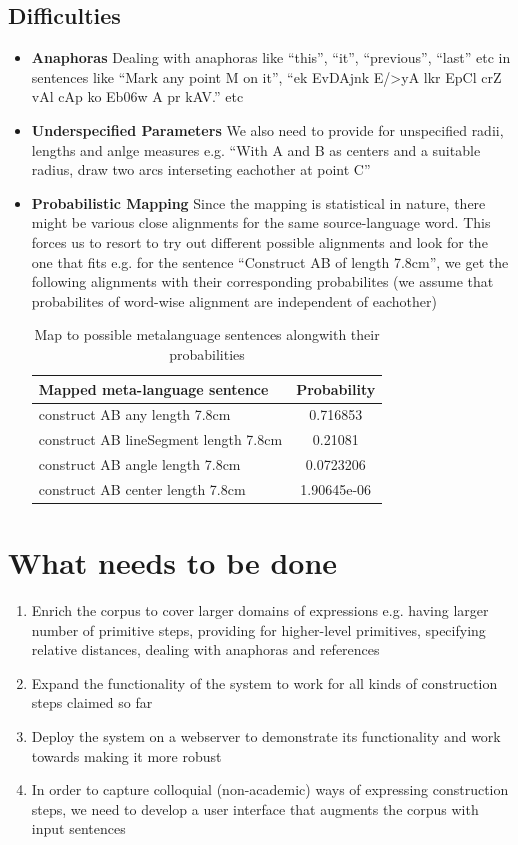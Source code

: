 \def\DevnagVersion{2.15}\documentclass[12pt]{article}
\begin{document}
\subsection{Difficulties}
\begin{itemize}
\item {\bf Anaphoras}
Dealing with anaphoras like ``this'', ``it'', ``previous'', ``last'' etc in sentences like ``Mark any point M on it'', ``{\dn ek EvDAjnk E/>yA l\?kr EpCl\? crZ vAl\? cAp ko Eb\306w} A {\dn pr kAV\?{\qva}.}'' etc
\item {\bf Underspecified Parameters}
We also need to provide for unspecified radii, lengths and anlge measures e.g. ``With A and B as centers and a suitable radius, draw two arcs interseting eachother at point C''
\item {\bf Probabilistic Mapping}
Since the mapping is statistical in nature, there might be various close alignments for the same source-language word. This forces us to resort to try out different possible alignments and look for the one that fits e.g. for the sentence ``Construct AB of length 7.8cm'', we get the following alignments with their corresponding probabilites (we assume that probabilites of word-wise alignment are independent of eachother)
\begin{table}[H]
\begin{center}
\begin{tabular}{lc}
\hline
\bf{Mapped meta-language sentence} & \bf{Probability}\\\hline
construct AB any length 7.8cm & 0.716853\\
construct AB lineSegment length 7.8cm & 0.21081\\
construct AB angle length 7.8cm & 0.0723206\\
construct AB center length 7.8cm & 1.90645e-06\\
\hline
\end{tabular}
\caption{Map to possible metalanguage sentences alongwith their probabilities}
\end{center}
\end{table}
\end{itemize}

\section{What needs to be done}
\begin{enumerate}
\item Enrich the corpus to cover larger domains of expressions e.g. having larger number of primitive steps, providing for higher-level primitives, specifying relative distances, dealing with anaphoras and references
\item Expand the functionality of the system to work for all kinds of construction steps claimed so far
\item Deploy the system on a webserver to demonstrate its functionality and work towards making it more robust
\item In order to capture colloquial (non-academic) ways of expressing construction steps, we need to develop a user interface that augments the corpus with input sentences
\end{enumerate}

\nocite{schreck2012geometric}
\nocite{gulwani2011synthesizing}
\nocite{ahmed2012can}
\nocite{itzhaky2012solving}
\nocite{zettlemoyer2012learning}
\nocite{och2003systematic}

{}

\end{document}
